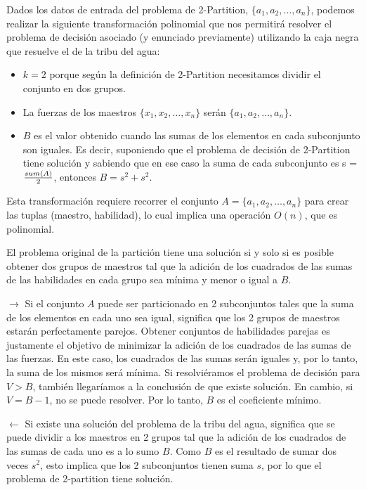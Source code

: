 \documentclass{article}
\begin{document}
Dados los datos de entrada del problema de 2-Partition, \( \{a_1, a_2, \ldots, a_n\} \), podemos realizar la siguiente transformación polinomial que nos permitirá resolver el problema de decisión asociado (y enunciado previamente) utilizando la caja negra que resuelve el de la tribu del agua:

\begin{itemize}
    \item \( k = 2 \) porque según la definición de 2-Partition necesitamos dividir el conjunto en dos grupos.
    \item La fuerzas de los maestros \( \{x_1, x_2, \ldots, x_n\} \) serán \( \{a_1, a_2, \ldots, a_n\} \).
    \item \( B \) es el valor obtenido cuando las sumas de los elementos en cada subconjunto son iguales. Es decir, suponiendo que el problema de decisión de 2-Partition tiene solución y sabiendo que en ese caso la suma de cada subconjunto es s = \(sum(A)\over2\), entonces $B = s^2 + s^2$. 
\end{itemize}
Esta transformación requiere recorrer el conjunto $A = \{a_1, a_2, \ldots, a_n\}$ para crear las tuplas (maestro, habilidad), lo cual implica una operación $O(n)$, que es polinomial.

El problema original de la partición tiene una solución si y solo si es posible obtener dos grupos de maestros tal que la adición de los cuadrados de las sumas de las habilidades en cada grupo sea mínima y menor o igual a $B$.

$\rightarrow$ Si el conjunto $A$ puede ser particionado en 2 subconjuntos tales que la suma de los elementos en cada uno sea igual, significa que los 2 grupos de maestros estarán perfectamente parejos. Obtener conjuntos de habilidades parejas es justamente el objetivo de minimizar la adición de los cuadrados de las sumas de las fuerzas. En este caso, los cuadrados de las sumas serán iguales y, por lo tanto, la suma de los mismos será mínima. Si resolviéramos el problema de decisión para $V > B$, también llegaríamos a la conclusión de que existe solución. En cambio, si $V = B - 1$, no se puede resolver. Por lo tanto, $B$ es el coeficiente mínimo.

$\leftarrow$ Si existe una solución del problema de la tribu del agua, significa que se puede dividir a los maestros en 2 grupos tal que la adición de los cuadrados de las sumas de cada uno es a lo sumo $B$. Como $B$ es el resultado de sumar dos veces $s^2$, esto implica que los 2 subconjuntos tienen suma $s$, por lo que el problema de 2-partition tiene solución.
\end{document}
